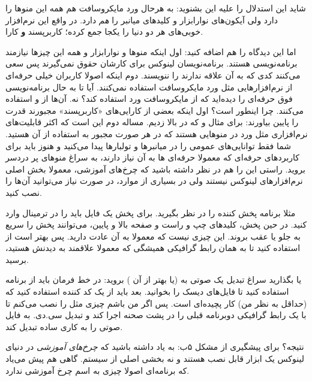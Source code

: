 شاید این استدلال را علیه این بشنوید: به هرحال ورد مایکروسافت هم همه این منوها را دارد ولی آیکون‌های نوارابزار و کلیدهای میانبر را
\emph{هم}
دارد. در واقع این نرم‌افزار خوبی‌های هر دو دنیا را یکجا جمع کرده؛ کاربرپسند
\textbf{و}
کارا.

اما این دیدگاه را هم اضافه کنید: اول اینکه منوها و نوارابزار و همه این چیزها نیازمند برنامه‌نویسی هستند. برنامه‌نویسان لینوکس برای کارشان حقوق نمی‌گیرند پس سعی می‌کنند کدی که به آن علاقه ندارند را ننویسند. دوم اینکه اصولا کاربران خیلی حرفه‌ای از نرم‌افزارهایی مثل ورد مایکروسافت استفاده نمی‌کنند. آیا تا به حال برنامه‌نویسی فوق حرفه‌ای را دیده‌اید که از مایکروسافت ورد استفاده کند؟ نه. آن‌ها از 
 و 
استفاده می‌کنند.
چرا اینطور است؟ اول اینکه بعضی از کارایی‌های «کاربرپسند» مجبورند قدرت را پایین بیاورند: برای مثال 
 و 
 که در بالا زدیم. مساله دوم این است که اکثر قابلیت‌های نرم‌افزاری مثل ورد در منوهایی هستند که در هر صورت مجبور به استفاده از آن هستید. شما فقط توانایی‌های عمومی را در میانبرها و تولبارها پیدا می‌کنید و هنوز باید برای کاربردهای حرفه‌ای که معمولا حرفه‌ای ها به آن نیاز دارند، به سراغ منوهای پر دردسر بروید.
راستی این را هم در نظر داشته باشید که چرخ‌های آموزشی، معمولا بخش اصلی نرم‌افزارهای لینوکس نیستند ولی در بسیاری از موارد، در صورت نیاز می‌توانید آن‌ها را نصب کنید.

مثلا برنامه پخش کننده 
 را در نظر بگیرید. برای پخش یک فایل باید 
 را در ترمینال وارد کنید. در حین پخش، کلیدهای چپ و راست و صفحه بالا و پایین، می‌توانند پخش را سریع به جلو یا عقب بروند. این چیزی نیست که معمولا به آن عادت دارید. پس بهتر است از 
 استفاده کنید تا به همان رابط گرافیکی همیشگی که معمولا علاقمند به دیدنش هستید، برسید.

یا بگذارید سراغ تبدیل یک 
صوتی به 
 (یا بهتر از آن 
) بروید: در خط فرمان باید از برنامه 
 استفاده کنید تا فایل‌های دیسک را بخوانید. بعد باید از یک کد کننده استفاده کنید که (حداقل به نظر من) کار پچیده‌ای است. پس اگر من باشم چیزی مثل 
 را نصب می‌کنم تا با یک رابط گرافیکی دوبرنامه قبلی را در پشت صحنه اجرا کند و تبدیل سی.دی. به فایل صوتی را به کاری ساده تبدیل کند.

نتیجه؟ برای پیشگیری از مشکل ۵ب: به یاد داشته باشید که
\emph{چرخ‌های آموزشی}
در دنیای لینوکس یک ابزار قابل نصب هستند و نه بخشی اصلی از سیستم. گاهی هم پیش می‌یاد که برنامه‌ای اصولا چیزی به اسم چرخ آموزشی ندارد.
